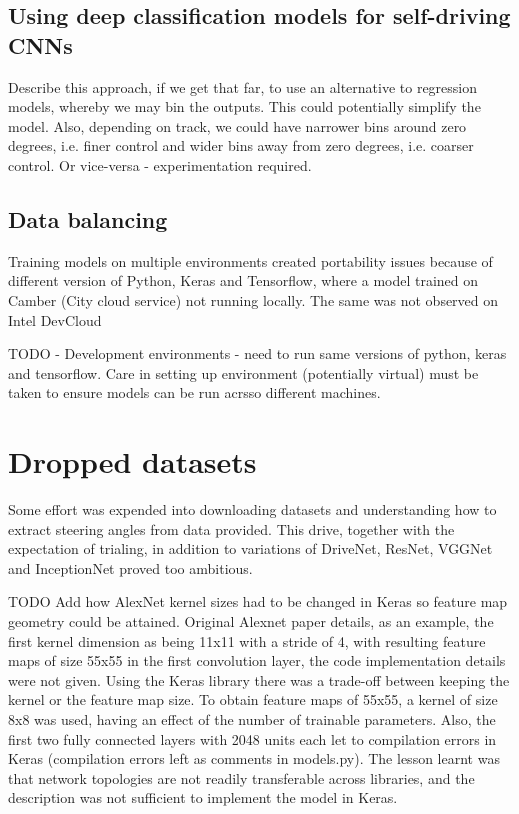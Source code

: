 \subsection{Using deep classification models for self-driving CNNs} %
Describe this approach, if we get that far, to use an alternative to regression models, whereby we may bin the outputs. This could potentially simplify the model. Also, depending on track, we could have narrower bins around zero degrees, i.e. finer control and wider bins away from zero degrees, i.e. coarser control. Or vice-versa - experimentation required.
\subsection{Data balancing}



Training models on multiple environments created portability issues because of different version of Python, Keras and Tensorflow, where a model trained on Camber (City cloud service) not running locally. The same was not observed on Intel DevCloud 

TODO - Development environments - need to run same versions of python, keras and tensorflow. Care in setting up environment (potentially virtual) must be taken to ensure models can be run acrsso different machines.
\section{Dropped datasets}
Some effort was expended into downloading datasets and understanding how to extract steering angles from data provided. This drive, together with the expectation of trialing, in addition to variations of DriveNet, ResNet, VGGNet and InceptionNet proved too ambitious.   

TODO Add how AlexNet kernel sizes had to be changed in Keras so feature map geometry could be attained. Original Alexnet paper details, as an example, the first kernel dimension as being 11x11 with a stride of 4, with resulting feature maps of size 55x55 in the first convolution layer, the code implementation details were not given. Using the Keras library there was a trade-off between keeping the kernel or the feature map size. To obtain feature maps of 55x55, a kernel of size 8x8 was used, having an effect of the number of trainable parameters. 
Also, the first two fully connected layers with 2048 units each let to compilation errors in Keras (compilation errors left as comments in models.py). The lesson learnt was that network topologies are not readily transferable across libraries, and the description was not sufficient to implement the model in Keras.  

